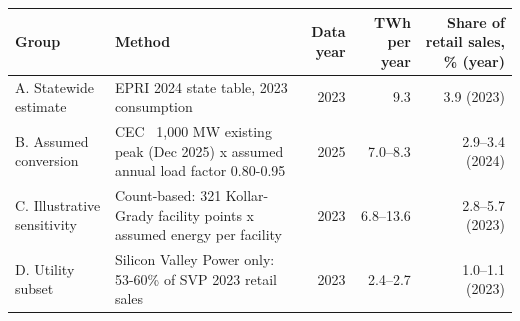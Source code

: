 \begin{tabular}{p{2.6cm}p{6.2cm}rrr}
\toprule
Group & Method & Data year & TWh per year & Share of retail sales, \% (year) \\
\midrule
A. Statewide estimate & EPRI 2024 state table, 2023 consumption & 2023 & 9.3 & 3.9 (2023) \\
B. Assumed conversion & CEC ~1,000 MW existing peak (Dec 2025) x assumed annual load factor 0.80-0.95 & 2025 & 7.0--8.3 & 2.9--3.4 (2024) \\
C. Illustrative sensitivity & Count-based: 321 Kollar-Grady facility points x assumed energy per facility & 2023 & 6.8--13.6 & 2.8--5.7 (2023) \\
D. Utility subset & Silicon Valley Power only: 53-60\% of SVP 2023 retail sales & 2023 & 2.4--2.7 & 1.0--1.1 (2023) \\
\bottomrule
\end{tabular}